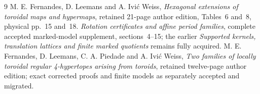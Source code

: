 \documentclass[11pt]{article}
\begin{document}
\begin{thebibliography}{9}
 M. E. Fernandes, D. Leemans and A. Ivi\'c Weiss,
\emph{Hexagonal extensions of toroidal maps and hypermaps}, retained
21-page author edition, Tables~6 and~8, physical pp.~15 and~18.
 \emph{Rotation certificates and affine period families},
complete accepted marked-model supplement, sections~4--15; the earlier
\emph{Supported kernels, translation lattices and finite marked quotients}
remains fully acquired.
 M. E. Fernandes, D. Leemans, C. A. Piedade and A. Ivi\'c Weiss,
\emph{Two families of locally toroidal regular 4-hypertopes arising from
toroids}, retained twelve-page author edition; exact corrected proofs
and finite models as separately accepted and migrated.
\end{thebibliography}
\end{document}
